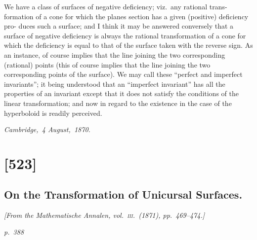 \documentclass[11pt,a4paper]{article}
\theoremstyle{plain}
\theoremstyle{definition}
\begin{document}
We have a class of surfaces of negative deficiency; viz.\ any rational trans-
formation of a cone for which the planes section has a given (positive) deficiency pro-
duces such a surface; and I think it may be answered conversely that a surface of
negative deficiency is always the rational transformation of a cone for which the
deficiency is equal to that of the surface taken with the reverse sign.  As an instance,
of course implies that the line joining the two corresponding (rational) points (this
of course implies that the line joining the two corresponding points of the surface).
We may call these ``perfect and imperfect invariants''; it being understood that an
``imperfect invariant'' has all the properties of an invariant except that it does
not satisfy the conditions of the linear transformation; and now in regard to the
existence in the case of the hyperboloid is readily perceived.

\noindent\textit{Cambridge,\ 4 August,\ 1870.}

\clearpage

\section{[523]}
\subsection{On the Transformation of Unicursal Surfaces.}

\begin{center}
\textit{[From the Mathematische Annalen, vol.~\textsc{iii}.\ (1871), pp.\ 469--474.]}
\end{center}

\textit{p.~388}
\end{document}
